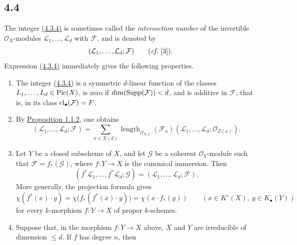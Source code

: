 \subsection*{4.4}
The integer \hyperlink{sga6.e10.eq.4-3-4}{(4.3.4)} is sometimes called the \emph{intersection number} of the
invertible $\mathcal O_X$-modules $\mathcal L_1,\ldots,\mathcal L_d$ with
$\mathcal F$, and is denoted by
\[
(\mathcal L_1,\ldots,\mathcal L_d;\mathcal F)
\qquad(\emph{cf.}~[3]).
\]
Expression \hyperlink{sga6.e10.eq.4-3-4}{(4.3.4)} immediately gives the following properties.

\begin{enumerate}[label=\arabic*)]
\item The integer \hyperlink{sga6.e10.eq.4-3-4}{(4.3.4)} is a symmetric $d$-linear function of
  the classes $L_1,\ldots,L_d\in\operatorname{Pic}(X)$, is zero if
  $\dim(\operatorname{Supp}(\mathcal F))<d$, and is additive in $\mathcal F$, that is, in
  its class $\operatorname{cl}_\bullet(\mathcal F)=F$.

\item By \hyperlink{sga6.e10.prop.1-1-2}{Proposition 1.1.2}, one obtains
\begin{equation}\tag{4.4.1}
(\mathcal L_1,\ldots,\mathcal L_d;\mathcal F)=
\sum_{x\in X(d)}
\operatorname{length}_{\mathcal O_{X,x}}(\mathcal F_x)
(\mathcal L_1,\ldots,\mathcal L_d;\mathcal O_{Z(x)}).
\end{equation}

\item Let $Y$ be a closed subscheme of $X$, and let $\mathcal G$ be a coherent
  $\mathcal O_Y$-module such that $\mathcal F=f_*(\mathcal G)$, where
  $f:Y\to X$ is the
  canonical immersion. Then
\[
(f^*\mathcal L_1,\ldots,f^*\mathcal L_d;\mathcal G)
=(\mathcal L_1,\ldots,\mathcal L_d;\mathcal F).
\]
More generally, the projection formula gives
\begin{equation}\tag{4.4.2}
\chi(f^*(x)\cdot y)
=\chi\bigl(f_*(f^*(x)\cdot y)\bigr)
=\chi(x\cdot f_*(y))
\qquad(x\in K^\circ(X),\ y\in K_\bullet(Y))
\end{equation}
for every $k$-morphism $f:Y\to X$ of proper $k$-schemes.

\item Suppose that, in the morphism $f:Y\to X$ above, $X$ and $Y$ are
  irreducible of dimension $\leq d$. If $f$ has degree $n$, then


\end{enumerate}

